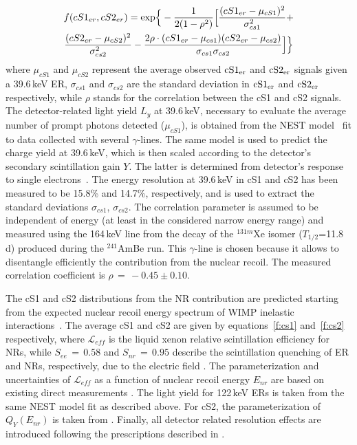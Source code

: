\begin{multline}
	f(cS1_{er},cS2_{er})  = {\rm exp} \Big\{ -\frac{1}{2(1-\rho^2)} \Big[ \frac{(cS1_{er} - \mu_{cS1})^2}{\sigma_{cs1}^2} + \\ 
	 \frac{(cS2_{er} - \mu_{cS2})^2}{\sigma_{cs2}^2} - \frac{2\rho\cdot(cS1_{er} - \mu_{cs1}) (cS2_{er} - \mu_{cs2})} {\sigma_{cs1}\sigma_{cs2}} \Big] \Big\}
\label{f:2dgaus}
\end{multline}
where $\mu_{cS1}$ and $\mu_{cS2}$ 
represent the average observed $\rm{cS1_{er}}$ and $\rm{cS2_{er}}$ signals given a 39.6\,keV ER, $\sigma_{cs1}$ and $\sigma_{cs2}$ are the standard deviation in $\rm{cS1_{er}}$ and $\rm{cS2_{er}}$ respectively,
while $\rho$ stands for the correlation between the cS1 and cS2 signals. The detector-related light yield $L_y$  at 39.6\,keV, necessary to evaluate the average number of prompt photons detected 
($\mu_{cS1}$), is obtained from the NEST model~\cite{NEST,Geant1,Geant2} fit to data collected with several $\gamma$-lines.
The same model is used to predict the charge yield at 39.6\,keV, which is then scaled according to the detector's secondary scintillation gain $Y$. 
 The latter is determined from detector's response to single electrons~\cite{SingleE}.
The energy resolution at 39.6\,keV in cS1 and cS2 has been measured to be 15.8\% and 14.7\%, respectively, and is used to extract the standard 
deviations $\sigma_{cs1}$, $\sigma_{cs2}$.  The correlation parameter is assumed to be independent of energy (at least in the considered narrow energy range) and measured
using the 164\,keV line from the decay of the $^{131m}$Xe isomer ($T_{1/2}$=11.8\,d) produced during the  $^{241}$AmBe run. This $\gamma$-line is chosen because it allows to disentangle efficiently the contribution from the nuclear recoil. The measured correlation coefficient is $\rho \, = \, -0.45 \pm 0.10$. 


The cS1 and cS2 distributions from the NR contribution are predicted starting from the expected nuclear recoil energy spectrum
of WIMP inelastic interactions~\cite{Baudis:2013bba}. The average cS1 and cS2 are given by equations~\ref{f:cs1} and~\ref{f:cs2} respectively,
where $\mathcal{L}_{eff}$ is the liquid xenon relative scintillation efficiency for NRs, while $S_{ee} \, = \, 0.58$  and $S_{nr} \, = \, 0.95$ describe the scintillation 
quenching  of ER and NRs, respectively, due to the electric field \cite{ScintQuenching}. The parameterization and uncertainties of $\mathcal{L}_{eff}$ as a function of nuclear recoil energy $E_{nr}$ are based on existing 
direct measurements \cite{run8Result}. The light yield for 122\,keV ERs is taken from the same NEST model fit as described above. For cS2, the parameterization 
of $Q_{Y}(E_{nr})$ is taken from \cite{QY}. Finally, all detector related resolution effects are introduced following the prescriptions described in \cite{Aprile:2012vw}.

